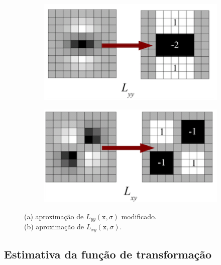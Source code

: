 \begin{figure}[H]
    \centering
    \begin{subfigure}[t]{0.3\textwidth}
      \includegraphics[width=\textwidth]{figuras/surfLyy.png}
      \label{fig:surfyy}
    \end{subfigure}
    \begin{subfigure}[t]{0.3\textwidth}
      \includegraphics[width=\textwidth]{figuras/surfLxy.png}
      \label{fig:surfxy}
    \end{subfigure} 
    \caption{(a) aproximação de $L_{yy}(\mathtt{x}, \sigma)$ \cite{surfYuan} modificado. \\
             (b) aproximação de $L_{xy}(\mathtt{x}, \sigma)$.}
    \label{fig:surf}
\end{figure}

\subsection{Estimativa da função de transformação}
    
